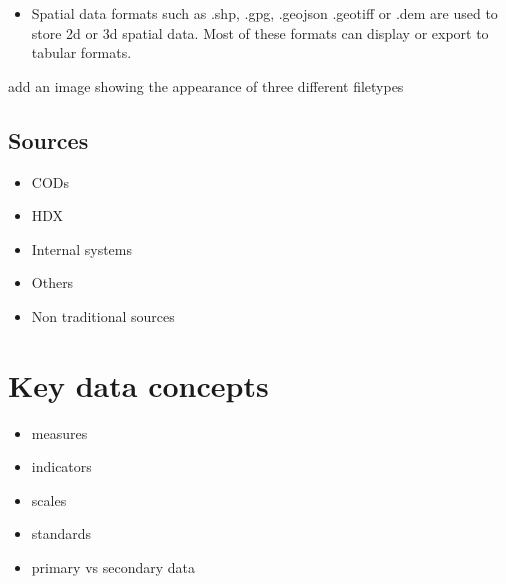 \documentclass[letterpaper,10pt,english]{jupyterBook}
\begin{document}
\begin{itemize}
\item {} 
\sphinxAtStartPar
{} Spatial data formats such as .shp, .gpg, .geojson .geotiff or .dem are used to store 2d or 3d spatial data. Most of these formats can display or export to tabular formats.

\end{itemize}

\begin{sphinxShadowBox}

\sphinxAtStartPar
add an image showing the appearance of three different filetypes
\end{sphinxShadowBox}


\subsection{Sources}
\label{\detokenize{part1/data literacy:sources}}\begin{itemize}
\item {} 
\sphinxAtStartPar
CODs

\item {} 
\sphinxAtStartPar
HDX

\item {} 
\sphinxAtStartPar
Internal systems

\item {} 
\sphinxAtStartPar
Others

\item {} 
\sphinxAtStartPar
Non traditional sources

\end{itemize}


\section{Key data concepts}
\label{\detokenize{part1/data literacy:key-data-concepts}}\begin{itemize}
\item {} 
\sphinxAtStartPar
measures

\item {} 
\sphinxAtStartPar
indicators

\item {} 
\sphinxAtStartPar
scales

\item {} 
\sphinxAtStartPar
standards

\item {} 
\sphinxAtStartPar
primary vs secondary data

\end{itemize}
\end{document}
